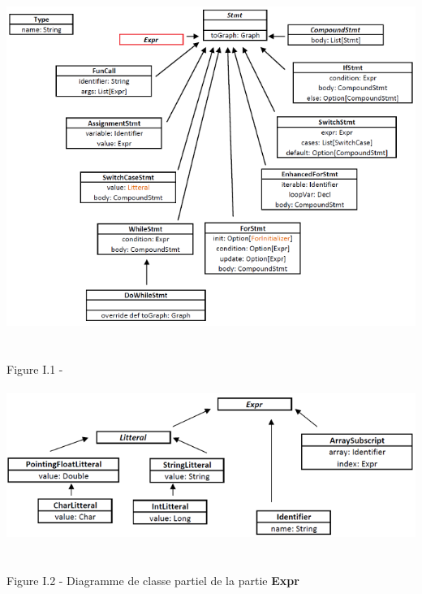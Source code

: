 \documentclass{report}
\begin{document}
\begin{center}
\includegraphics[scale=0.9]{data/stmt.png}
~\\~\\Figure I.1 - 
\end{center}

\paragraph{}
\hspace{4mm}\textnormal{}

\begin{center}
\includegraphics[scale=0.9]{data/expr1.png}
~\\~\\Figure I.2 - Diagramme de classe partiel de la partie \textbf{Expr}
\end{center}

\paragraph{}
\hspace{4mm}\textnormal{}
\end{document}

